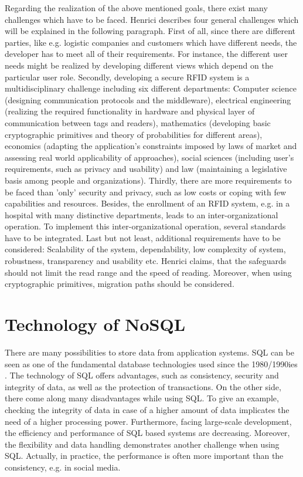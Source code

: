 Regarding the realization of the above mentioned goals, there exist many challenges which have to be faced. Henrici \cite[p.66 ff.]{henrici} describes four general challenges which will be explained in the following paragraph. 
First of all, since there are different parties, like e.g. logistic companies and customers which have different needs, the developer has to meet all of their requirements. For instance, the different user needs might be realized by developing different views which depend on the particular user role.
Secondly, developing a secure RFID system is a multidisciplinary challenge \cite{henrici} including six different departments: Computer science (designing communication protocols and the middleware), electrical engineering (realizing the required functionality in hardware and physical layer of communication between tags and readers), mathematics (developing basic cryptographic primitives and theory of probabilities for different areas), economics (adapting the application's constraints imposed by laws of market and assessing real world applicability of approaches), social sciences (including user's requirements, such as privacy and usability) and law (maintaining a legislative basis among people and organizations).
Thirdly, there are more requirements to be faced than 'only' security and privacy, such as low costs or coping with few capabilities and resources. Besides, the enrollment of an RFID system, e.g. in a hospital with many distinctive departments, leads to an inter-organizational operation. To implement this inter-organizational operation, several standards have to be integrated. 
Last but not least, additional requirements have to be considered: Scalability of the system, dependability, low complexity of system, robustness, transparency and usability etc. Henrici claims, that the safeguards should not limit the read range and the speed of reading. Moreover, when using cryptographic primitives, migration paths should be considered.  

\section{Technology of NoSQL} \label{nosql}

There are many possibilities to store data from application systems. \ac{SQL} can be seen as one of the fundamental database technologies used since the 1980/1990ies \cite[p.137 ff.]{nosql_meier}. The technology of SQL offers advantages, such as consistency, security and integrity of data, as well as the protection of transactions. On the other side, there come along many disadvantages while using SQL. To give an example, checking the integrity of data in case of a higher amount of data implicates the need of a higher processing power. Furthermore, facing large-scale development, the efficiency and performance of SQL based systems are decreasing. Moreover, the flexibility and data handling demonstrates another challenge when using SQL. Actually, in practice, the performance is often more important than the consistency, e.g. in social media.    

